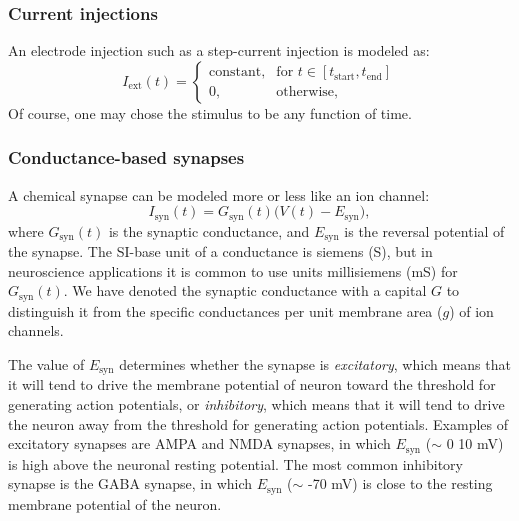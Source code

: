 \subsubsection{Current injections}
An electrode injection such as a step-current injection is modeled as:
\begin{equation}
I_\text{ext}(t)= 
\begin{cases}
    \text{constant}, & \text{for } t \in [t_\mathrm{start}, t_\mathrm{end}] \\
    0,              & \text{otherwise},
\end{cases}
\label{eq:Neuron:injected}
\end{equation}
Of course, one may chose the stimulus to be any function of time.


\subsubsection{Conductance-based synapses}
\label{sec:Ch-Neuron:conductance-based-synapses}
A chemical synapse can be modeled more or less like an ion channel:
\begin{equation}
I_\text{syn}(t) = {G}_\text{syn}(t) \big(V(t)-E_\text{syn} \big), 
\label{eq:Neuron:chemicalsynapse}
\end{equation}
where $G_\text{syn}(t)$ is the synaptic conductance, and $E_\text{syn}$ is the reversal potential of the synapse. The SI-base unit of a conductance is siemens (\si{\siemens}), but in neuroscience applications it is common to use units millisiemens (\si{\milli\siemens}) for $G_\text{syn}(t)$. We have denoted the synaptic conductance with a capital $G$ to distinguish it from the specific conductances per unit membrane area ($g$) of ion channels.

The value of $E_\text{syn}$ determines whether the synapse is \textit{excitatory}, which means that it will tend to drive the  membrane potential of  neuron toward the threshold for generating action potentials, or \textit{inhibitory}, which means that it will tend to drive the neuron away from the threshold for generating action potentials. Examples of excitatory synapses are AMPA and NMDA synapses, in which $E_\text{syn}$ ($\sim$ 0 \gex{--} 10 mV) is high above the neuronal resting potential. The most common inhibitory synapse is the GABA synapse, in which $E_\text{syn}$ ($\sim$ -70 mV) is close to the resting membrane potential of the neuron.

